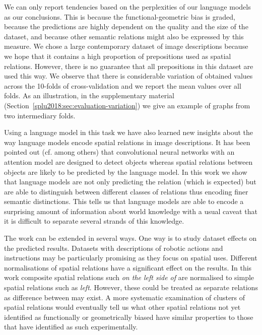 We can only report tendencies based on the perplexities of our
language models as our conclusions. This is because the
functional-geometric bias is graded, because the predictions are
highly dependent on the quality and the size of the dataset, and
because other semantic relations might also be expressed by this
measure. We chose a large contemporary dataset of image descriptions
because we hope that it contains a high proportion of prepositions
used as spatial relations. However, there is no guarantee that all
prepositions in this dataset are used this way. We observe that there
is considerable variation of obtained values across the 10-folds of
cross-validation %
and we report the mean values over all folds. As an illustration, in
the supplementary material (Section~\ref{splu2018:sec:evaluation-variation}) we
give an example of graphs from two intermediary folds.


Using a language model in this task we have also learned new insights
about the way language models encode spatial relations in image
descriptions. It has been pointed out (cf. \cite{kelleher2017what}
among others) that convolutional neural networks with an attention
model are designed to detect objects whereas spatial relations between
objects are likely to be predicted by the language model. In this work
we show that language models are not only predicting the relation
(which is expected) but are able to distinguish between different
classes of relations thus encoding finer semantic distinctions. This
tells us that language models are able to encode a surprising amount
of information about world knowledge with a usual caveat that it is
difficult to separate several strands of this knowledge.

The work can be extended in several ways. One way is to study dataset
effects on the predicted results. Datasets with descriptions of
robotic actions and instructions may be particularly promising as they
focus on spatial uses. Different normalisations of spatial relations
have a significant effect on the results. In this work composite
spatial relations such \emph{on the left side of} are normalised to
simple spatial relations such as \emph{left}. However, these could be
treated as separate relations as difference between may exist. A more
systematic examination of clusters of spatial relations would
eventually tell us what other spatial relations not yet identified as
functionally or geometrically biased have similar properties to those
that have identified as such experimentally.






